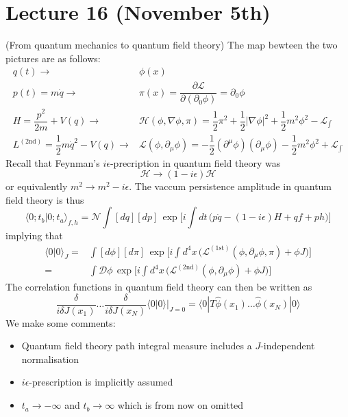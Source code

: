 \section{Lecture 16 (November 5th)}
\begin{rmk}
(From quantum mechanics to quantum field theory) The map bewteen the two pictures are as follows:
\[\begin{align*}
q(t)\rightarrow &\phi (x)\\
p(t)=m\dot{q}\rightarrow & \pi (x)=\dfrac{\partial \mathcal{L}}{\partial (\partial _{0}\phi )}=\partial _{0}\phi  \\
H=\dfrac{p^2}{2m}+V(q)\rightarrow & \mathcal{H}(\phi ,\nabla \phi ,\pi )=\dfrac{1}{2}\pi ^2+\dfrac{1}{2}|\nabla \phi |^2+\dfrac{1}{2}m^2\phi ^2-\mathcal{L}_{\mathrm{\int }}\\
L^{(2\mathrm{nd})}=\dfrac{1}{2}m\dot{q}^2-V(q)\rightarrow &\mathcal{L}(\phi ,\partial _{\mu }\phi )=-\dfrac{1}{2}(\partial ^{\mu }\phi )(\partial _{\mu }\phi )-\dfrac{1}{2}m^2\phi ^2+\mathcal{L}_{\mathrm{\int }}
\end{align*}\]
Recall that Feynman's $i\epsilon $-precription in quantum field theory was
\[\mathcal{H}\rightarrow (1-i\epsilon )\mathcal{H}\]
or equivalently $m^2\rightarrow m^2-i\epsilon $. The vaccum persistence amplitude in quantum field theory is thus
\[\langle 0;t_{b}|0;t_{a}\rangle _{f,h}=\mathcal{N}\int [dq][dp]\,\exp \Big[i\int dt\,\Big(p\dot{q}-(1-i\epsilon )H+qf+ph\Big)\Big]\]
implying that
\[\begin{align*}
\langle 0|0\rangle _{J}=&\int [d\phi ][d\pi]\,\exp \Big[i\int d^{4}x\,\Big(\mathcal{L}^{(1\mathrm{st})}(\phi ,\partial _{\mu }\phi ,\pi )+\phi J\Big)\Big]\\
=&\int \mathcal{D}\phi\,\exp \Big[i\int d^{4}x\,\Big(\mathcal{L}^{(2\mathrm{nd})}(\phi ,\partial _{\mu }\phi )+\phi J\Big)\Big]
\end{align*}\]
The correlation functions in quantum field theory can then be written as
\[\dfrac{\delta }{i\delta J(x_1)}\ldots \dfrac{\delta }{i\delta J(x_{N})}\langle 0|0\rangle |_{J=0}=\langle 0|T\hat{\phi }(x_1)\ldots \hat{\phi }(x_{N})|0\rangle \]
We make some comments:
\begin{itemize}
\item[(i)] Quantum field theory path integral measure includes a $J$-independent normalisation
\item[(ii)] $i\epsilon $-prescription is implicitly assumed
\item[(iii)] $t_{a}\rightarrow -\infty $ and $t_{b}\rightarrow \infty $ which is from now on omitted

\end{itemize}
\end{rmk}
